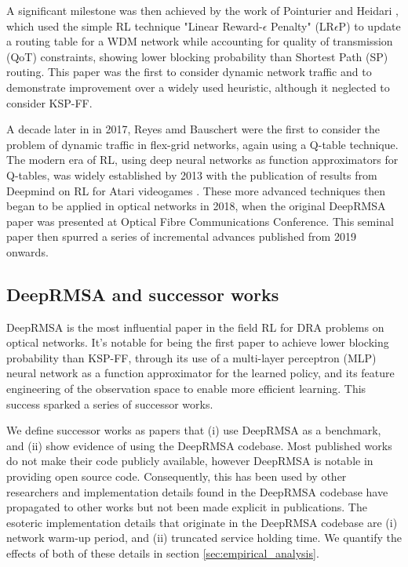 A significant milestone was then achieved by the work of Pointurier and Heidari \cite{pointurier_reinforcement_2007}, which used the simple RL technique "Linear Reward-$\epsilon$ Penalty" (LR$\epsilon$P) to update a routing table for a WDM network while accounting for quality of transmission (QoT) constraints, showing lower blocking probability than Shortest Path (SP) routing. This paper was the first to consider dynamic network traffic and to demonstrate improvement over a widely used heuristic, although it neglected to consider KSP-FF. 

A decade later in in 2017, Reyes amd Bauschert \cite{reyes_adaptive_2017} were the first to consider the problem of dynamic traffic in flex-grid networks, again using a Q-table technique. The modern era of RL, using deep neural networks as function approximators for Q-tables, was widely established by 2013 with the publication of results from Deepmind on RL for Atari videogames \cite{mnih_asynchronous_2016}. These more advanced techniques then began to be applied in optical networks in 2018, when the original DeepRMSA paper was presented at Optical Fibre Communications Conference. This seminal paper then spurred a series of incremental advances published from 2019 onwards.




\subsection{DeepRMSA and successor works}
\label{sec:survey-deeprmsa}

DeepRMSA \cite{chen_deeprmsa_2019} is the most influential paper in the field RL for DRA problems on optical networks. It's notable for being the first paper to achieve lower blocking probability than KSP-FF, through its use of a multi-layer perceptron (MLP) neural network as a function approximator for the learned policy, and its feature engineering of the observation space to enable more efficient learning. This success sparked a series of successor works.

We define successor works as papers that (i) use DeepRMSA as a benchmark, and (ii) show evidence of using the DeepRMSA codebase. Most published works do not make their code publicly available, however DeepRMSA is notable in providing open source code. Consequently, this has been used by other researchers and implementation details found in the DeepRMSA codebase have propagated to other works but not been made explicit in publications. The esoteric implementation details that originate in the DeepRMSA codebase are (i) network warm-up period, and (ii) truncated service holding time. We quantify the effects of both of these details in section \ref{sec:empirical_analysis}.

